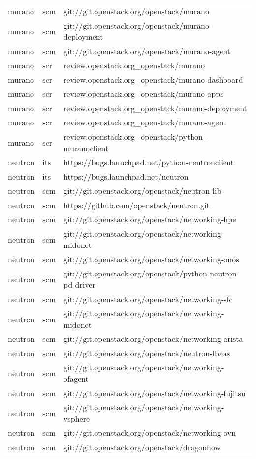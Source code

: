 \begin{center}
\begin{longtable}{|p{4cm}|p{1cm}|p{10cm}|}
murano&scm&git://git.openstack.org/openstack/murano\\ 
murano&scm&git://git.openstack.org/openstack/murano-deployment\\ 
murano&scm&git://git.openstack.org/openstack/murano-agent\\ 
murano&scr&review.openstack.org\_openstack/murano\\ 
murano&scr&review.openstack.org\_openstack/murano-dashboard\\ 
murano&scr&review.openstack.org\_openstack/murano-apps\\ 
murano&scr&review.openstack.org\_openstack/murano-deployment\\ 
murano&scr&review.openstack.org\_openstack/murano-agent\\ 
murano&scr&review.openstack.org\_openstack/python-muranoclient\\ 
neutron&its&https://bugs.launchpad.net/python-neutronclient\\ 
neutron&its&https://bugs.launchpad.net/neutron\\ 
neutron&scm&git://git.openstack.org/openstack/neutron-lib\\ 
neutron&scm&https://github.com/openstack/neutron.git\\ 
neutron&scm&git://git.openstack.org/openstack/networking-hpe\\ 
neutron&scm&git://git.openstack.org/openstack/networking-midonet\\ 
neutron&scm&git://git.openstack.org/openstack/networking-onos\\ 
neutron&scm&git://git.openstack.org/openstack/python-neutron-pd-driver\\ 
neutron&scm&git://git.openstack.org/openstack/networking-sfc\\ 
neutron&scm&git://git.openstack.org/openstack/networking-midonet\\ 
neutron&scm&git://git.openstack.org/openstack/networking-arista\\ 
neutron&scm&git://git.openstack.org/openstack/neutron-lbaas\\ 
neutron&scm&git://git.openstack.org/openstack/networking-ofagent\\ 
neutron&scm&git://git.openstack.org/openstack/networking-fujitsu\\ 
neutron&scm&git://git.openstack.org/openstack/networking-vsphere\\ 
neutron&scm&git://git.openstack.org/openstack/networking-ovn\\ 
neutron&scm&git://git.openstack.org/openstack/dragonflow\\ 

\end{longtable}
\end{center}
